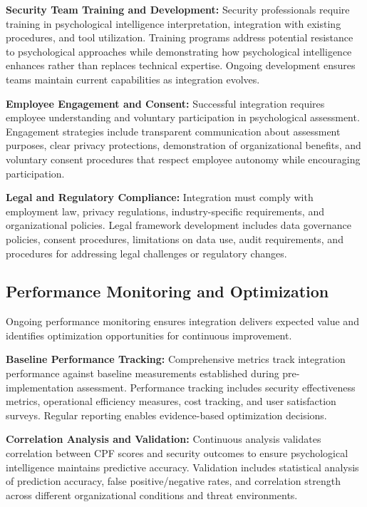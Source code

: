 \documentclass[10pt, twocolumn]{article}
\begin{document}
\textbf{Security Team Training and Development:} Security professionals require training in psychological intelligence interpretation, integration with existing procedures, and tool utilization. Training programs address potential resistance to psychological approaches while demonstrating how psychological intelligence enhances rather than replaces technical expertise. Ongoing development ensures teams maintain current capabilities as integration evolves.

\textbf{Employee Engagement and Consent:} Successful integration requires employee understanding and voluntary participation in psychological assessment. Engagement strategies include transparent communication about assessment purposes, clear privacy protections, demonstration of organizational benefits, and voluntary consent procedures that respect employee autonomy while encouraging participation.

\textbf{Legal and Regulatory Compliance:} Integration must comply with employment law, privacy regulations, industry-specific requirements, and organizational policies. Legal framework development includes data governance policies, consent procedures, limitations on data use, audit requirements, and procedures for addressing legal challenges or regulatory changes.

\subsection{Performance Monitoring and Optimization}

Ongoing performance monitoring ensures integration delivers expected value and identifies optimization opportunities for continuous improvement.

\textbf{Baseline Performance Tracking:} Comprehensive metrics track integration performance against baseline measurements established during pre-implementation assessment. Performance tracking includes security effectiveness metrics, operational efficiency measures, cost tracking, and user satisfaction surveys. Regular reporting enables evidence-based optimization decisions.

\textbf{Correlation Analysis and Validation:} Continuous analysis validates correlation between CPF scores and security outcomes to ensure psychological intelligence maintains predictive accuracy. Validation includes statistical analysis of prediction accuracy, false positive/negative rates, and correlation strength across different organizational conditions and threat environments.
\end{document}
